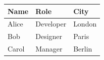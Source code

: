 \begin{tabular}{lll}
Name & Role & City \\
\hline
Alice & Developer & London \\
Bob & Designer & Paris \\
Carol & Manager & Berlin \\
\end{tabular}
